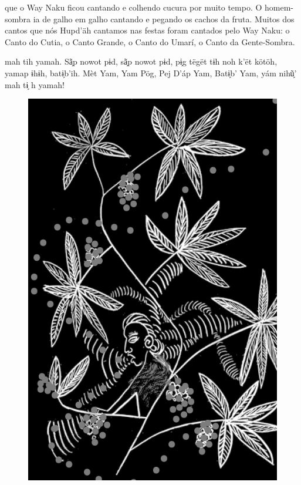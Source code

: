 \mbox{}\vspace*{\fill}

 que o Way Naku ficou
cantando e colhendo cucura
por muito tempo. O homem-sombra
ia de galho em galho
cantando e pegando os cachos
da fruta. Muitos dos cantos
que nós Hupd’äh cantamos nas
festas foram cantados pelo Way
Naku: o Canto do Cutia, o Canto
Grande, o Canto do Umarí, o
Canto da Gente-Sombra.

\vspace{2em}

 mah tih yamah. Sã̗p nowot
pɨd, sã̗p nowot pɨd, pɨ̗g tëgët
tɨh noh k’ët kötöh, yamap ɨhɨh,
batɨ̗b’ih. Mèt Yam, Yam Pög, Pej
D’áp Yam, Batɨ̗b’ Yam, yám nihũ̗’
mah tɨ̗ h yamah!

\vspace*{\fill}

\begin{figure}
\vspace*{-1.5cm}
\hspace*{-2.4cm}\includegraphics[width=142mm]{./imgs/img3.jpg}
\end{figure}

